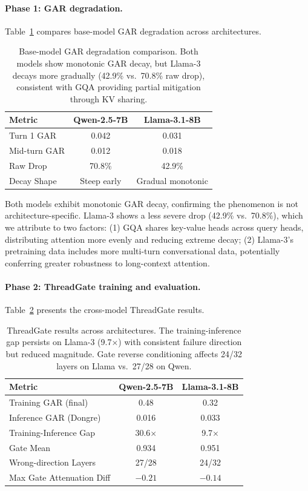 \documentclass[11pt,a4paper]{article}
\begin{document}
\paragraph{Phase 1: GAR degradation.}
Table~\ref{tab:cross_phase1} compares base-model GAR degradation across architectures.

\begin{table}[t]
\centering
\caption{Base-model GAR degradation comparison. Both models show monotonic GAR decay, but Llama-3 decays more gradually (42.9\% vs.\ 70.8\% raw drop), consistent with GQA providing partial mitigation through KV sharing.}
\label{tab:cross_phase1}
\begin{tabular}{lcc}
\toprule
\textbf{Metric} & \textbf{Qwen-2.5-7B} & \textbf{Llama-3.1-8B} \\
\midrule
Turn 1 GAR   & 0.042  & 0.031 \\
Mid-turn GAR & 0.012  & 0.018 \\
Raw Drop     & 70.8\% & 42.9\% \\
Decay Shape  & Steep early & Gradual monotonic \\
\bottomrule
\end{tabular}
\end{table}

Both models exhibit monotonic GAR decay, confirming the phenomenon is not architecture-specific. Llama-3 shows a less severe drop (42.9\% vs.\ 70.8\%), which we attribute to two factors: (1) GQA shares key-value heads across query heads, distributing attention more evenly and reducing extreme decay; (2) Llama-3's pretraining data includes more multi-turn conversational data, potentially conferring greater robustness to long-context attention.

\paragraph{Phase 2: ThreadGate training and evaluation.}
Table~\ref{tab:cross_tg} presents the cross-model ThreadGate results.

\begin{table}[t]
\centering
\caption{ThreadGate results across architectures. The training-inference gap persists on Llama-3 (9.7$\times$) with consistent failure direction but reduced magnitude. Gate reverse conditioning affects 24/32 layers on Llama vs.\ 27/28 on Qwen.}
\label{tab:cross_tg}
\begin{tabular}{lcc}
\toprule
\textbf{Metric} & \textbf{Qwen-2.5-7B} & \textbf{Llama-3.1-8B} \\
\midrule
Training GAR (final)      & 0.48   & 0.32 \\
Inference GAR (Dongre)    & 0.016  & 0.033 \\
Training-Inference Gap    & 30.6$\times$ & 9.7$\times$ \\
Gate Mean                 & 0.934  & 0.951 \\
Wrong-direction Layers    & 27/28  & 24/32 \\
Max Gate Attenuation Diff & $-0.21$ & $-0.14$ \\
\bottomrule
\end{tabular}
\end{table}
\end{document}
